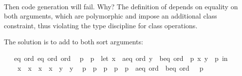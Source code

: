 \begin{isabellebody}
\isadelimproof
\ %
\endisadelimproof
%
\isatagproof
\isacommand{{\isachardot}{\isachardot}}\isamarkupfalse%
\isanewline
%
\endisatagproof
{\isafoldproof}%
%
\isadelimproof
%
\endisadelimproof
%
\isadelimML
%
\endisadelimML
%
\isatagML
%
\endisatagML
{\isafoldML}%
%
\isadelimML
%
\endisadelimML
%
\begin{isamarkuptext}%
Then code generation will fail.  Why?  The definition
  of  depends on equality on both arguments,
  which are polymorphic and impose an additional 
  class constraint, thus violating the type discipline
  for class operations.

  The solution is to add  to both sort arguments:%
\end{isamarkuptext}%
\isamarkuptrue%
\isamarkupfalse%
\ {\isacharasterisk}\ {\isacharcolon}{\isacharcolon}\ {\isacharparenleft}{\isachardoublequoteopen}{\isacharbraceleft}eq{\isacharcomma}\ ord{\isacharbraceright}{\isachardoublequoteclose}{\isacharcomma}\ {\isachardoublequoteopen}{\isacharbraceleft}eq{\isacharcomma}\ ord{\isacharbraceright}{\isachardoublequoteclose}{\isacharparenright}\ ord\isanewline
\ \ {\isachardoublequoteopen}p{}\ {\isacharless}\ p{}\ {\isasymequiv}\ let\ {\isacharparenleft}x{}\ {\isasymColon}\ {\isacharprime}a{\isasymColon}{\isacharbraceleft}eq{\isacharcomma}\ ord{\isacharbraceright}{\isacharcomma}\ y{}\ {\isasymColon}\ {\isacharprime}b{\isasymColon}{\isacharbraceleft}eq{\isacharcomma}\ ord{\isacharbraceright}{\isacharparenright}\ {\isacharequal}\ p{}{\isacharsemicolon}\ {\isacharparenleft}x{}{\isacharcomma}\ y{}{\isacharparenright}\ {\isacharequal}\ p{}\ in\isanewline
\ \ \ \ x{}\ {\isacharless}\ x{}\ {\isasymor}\ {\isacharparenleft}x{}\ {\isacharequal}\ x{}\ {\isasymand}\ y{}\ {\isacharless}\ y{}{\isacharparenright}{\isachardoublequoteclose}\isanewline
\ \ {\isachardoublequoteopen}p{}\ {\isasymle}\ p{}\ {\isasymequiv}\ p{}\ {\isacharless}\ p{}\ {\isasymor}\ {\isacharparenleft}p{}\ {\isasymColon}\ {\isacharprime}a{\isasymColon}{\isacharbraceleft}eq{\isacharcomma}\ ord{\isacharbraceright}\ {\isasymtimes}\ {\isacharprime}b{\isasymColon}{\isacharbraceleft}eq{\isacharcomma}\ ord{\isacharbraceright}{\isacharparenright}\ \ {\isacharequal}\ p{}{\isachardoublequoteclose}%
\isadelimproof
\ %
\endisadelimproof
%
\isatagproof
\isacommand{{\isachardot}{\isachardot}}\isamarkupfalse%

\end{isabellebody}
